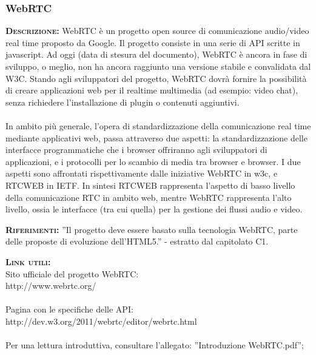 \subsubsection{WebRTC}
\begin{description}
	\item{\scshape\bfseries Descrizione:} WebRTC è un progetto open source di comunicazione audio/video real time proposto da Google. Il progetto consiste in una serie di API scritte in javascript. Ad oggi (data di stesura del documento), WebRTC è ancora in fase di sviluppo, o meglio, non ha ancora raggiunto una versione stabile e convalidata dal W3C. Stando agli sviluppatori del progetto, WebRTC dovrà fornire la possibilità di creare applicazioni web per il realtime multimedia (ad esempio: video chat), senza richiedere l'installazione di plugin o contenuti aggiuntivi.\\\\In ambito più generale, l'opera di standardizzazione della comunicazione real time mediante applicativi web, passa attraverso due aspetti: la standardizzazione delle interfacce programmatiche che i browser offriranno agli sviluppatori di applicazioni, e i protocolli per lo scambio di media tra browser e browser. I due aspetti sono affrontati rispettivamente dalle iniziative WebRTC in w3c, e RTCWEB in IETF. In sintesi RTCWEB rappresenta l'aspetto di basso livello della comunicazione RTC in ambito web, mentre WebRTC rappresenta l'alto livello, ossia le interfacce (tra cui quella) per la gestione dei flussi audio e video.

	\item{\scshape\bfseries Riferimenti:} ''Il progetto deve essere basato sulla tecnologia WebRTC, parte delle proposte di evoluzione dell'HTML5.'' - estratto dal capitolato C1.
	
	\item{\scshape\bfseries Link utili:}\\Sito ufficiale del progetto WebRTC:\\http://www.webrtc.org/\\\\Pagina con le specifiche delle API:\\http://dev.w3.org/2011/webrtc/editor/webrtc.html\\\\ Per una lettura introduttiva, consultare l'allegato: ''Introduzione WebRTC.pdf'';
\end{description}

